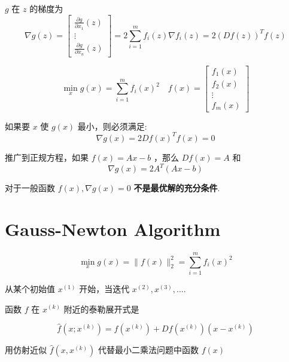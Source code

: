     $ g $ 在 $ z $ 的梯度为
    $$
    \nabla g(z)=\left[\begin{array}{c}
    \frac{\partial g}{\partial x_{1}}(z) \\
    \vdots \\
    \frac{\partial g}{\partial x_{n}}(z)
    \end{array}\right]=2 \sum_{i=1}^{m} f_{i}(z) \nabla f_{i}(z)=2(D f(z))^{T} f(z)
    $$

\begin{theorem}[非线性最小二乘问题的最优必要条件]
        $$
    \min _{x} g(x)=\sum_{i=1}^{m} f_{i}(x)^{2} \quad f(x)=\left[\begin{array}{c}
    f_{1}(x) \\
    f_{2}(x) \\
    \vdots \\
    f_{m}(x)
    \end{array}\right]
    $$

    如果要 $ x $ 使 $ g(x) $ 最小，则必须满足:
    $$
    \nabla g(x)=2 D f(x)^{T} f(x)=0
    $$
\end{theorem}

\begin{corollary}[正规方程的最优必要条件]
    推广到正规方程，如果 $ f(x)=A x-b $ ，那么 $ D f(x)=A $ 和
$$
\nabla g(x)=2 A^{T}(A x-b)
$$
\end{corollary}

\begin{remark}
    对于一般函数 $ f(x), \nabla g(x)=0 $ \textbf{不是最优解的充分条件}.
\end{remark}



\section{Gauss-Newton Algorithm}

\begin{problem}
    $$
\min _{x} g(x)=\|f(x)\|_{2}^{2}=\sum_{i=1}^{m} f_{i}(x)^{2}
$$

从某个初始值 $ x^{(1)} $ 开始，当迭代 $ x^{(2)}, x^{(3)}, \ldots $.
\end{problem}

函数 $ f $ 在 $ x^{(k)} $ 附近的泰勒展开式是

$$
\hat{f}\left(x ; x^{(k)}\right)=f\left(x^{(k)}\right)+D f\left(x^{(k)}\right)\left(x-x^{(k)}\right)
$$

用仿射近似 $ \hat{f}\left(x, x^{(k)}\right) $ 代替最小二乘法问题中函数 $ f(x) $

